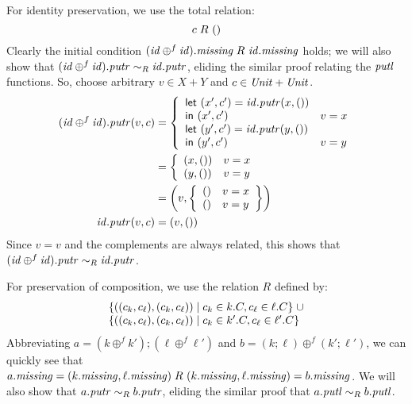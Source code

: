 \begin{defn}[$R$-similarity]
\begin{theorem}
\begin{lemma}
\begin{theorem}[No products]
\begin{lemma}
\begin{functoriality}
For identity preservation, we use the total relation:
\[c \mathrel{R_{}} {()}\]
Clearly the initial condition $(\mathit{id} \oplus^f \mathit{id}).\mathit{missing} \mathrel{R_{}}
\mathit{id}.\mathit{missing}$ holds; we will also show that $(\mathit{id} \oplus^f \mathit{id}).\mathit{putr} \sim_R
\mathit{id}.\mathit{putr}$, eliding the similar proof relating the $\mathit{putl}$ functions. So,
choose arbitrary $v \in X+Y$ and $c \in \mathit{Unit} + \mathit{Unit}$.
\begin{align*}
    (\mathit{id} \oplus^f \mathit{id}).\mathit{putr}(v,c) &= \left\{\begin{array}{ll}
        \mathsf{let}\  (x',c') = \mathit{id}.\mathit{putr}(x,()) \\
        \mathsf{in}\  ( x', c') & v =  x \\
        \mathsf{let}\  (y',c') = \mathit{id}.\mathit{putr}(y,()) \\
        \mathsf{in}\  ( y', c') & v =  y
    \end{array}\right. \\
    &= \left\{\begin{array}{ll}
        ( x,{()}) & v =  x \\
        ( y,{()}) & v =  y
    \end{array}\right. \\
    &= \left(v,\left\{\begin{array}{ll}{()} & v = 
        x\\{()} & v =  y\end{array}\right\}\right) \\
    \mathit{id}.\mathit{putr}(v,c) &= (v,{()})
\end{align*}
Since $v=v$ and the complements are always related, this shows that
$(\mathit{id}\oplus^f\mathit{id}).\mathit{putr}\sim_R\mathit{id}.\mathit{putr}$.

For preservation of composition, we use the relation $R$ defined by:
\[\begin{array}{l}
\{(( c_k, c_\ell), (c_k,c_\ell)) \mid c_k \in k.C,c_\ell
\in \ell.C\} \mathrel\cup \\
\{(( c_k, c_\ell), (c_k,c_\ell)) \mid c_k \in k'.C,c_\ell
\in \ell'.C\}
\end{array}\]
Abbreviating $a = (k\oplus^fk');(\ell\oplus^f\ell')$ and $b =
(k;\ell)\oplus^f(k';\ell')$,
we can quickly see that $a.\mathit{missing} = ( k.\mathit{missing},
\ell.\mathit{missing}) \mathrel{R_{}}  (k.\mathit{missing},\ell.\mathit{missing}) = b.\mathit{missing}$. We
will also show that $a.\mathit{putr} \sim_R b.\mathit{putr}$, eliding the similar proof that
$a.\mathit{putl} \sim_R b.\mathit{putl}$.


\end{functoriality}
\end{lemma}
\end{theorem}
\end{lemma}
\end{theorem}
\end{defn}
